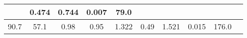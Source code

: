 \documentclass[a4paper,10pt]{article}
\begin{document}
\begin{longtable}{
     |
%    
    c|
%    
    c|
%    
    c|
%    
    c|
%    
    c|
%    
    c|
%    
    c|
%    
    c|
%    
    c|
%    
    c|
%    
    }
%        

%        
        & 0.474
%        

%        

%        
        & 0.744
%        

%        

%        
        & 0.007
%        

%        

%        
        & 79.0
%        

%        
        \\
        \hline

        

%        

%        
        90.7
%        

%        

%        
        & 57.1
%        

%        

%        
        & 0.98
%        

%        

%        
        & 0.95
%        

%        

%        
        & 1.322
%        

%        

%        
        & 0.49
%        

%        

%        
        & 1.521
%        

%        

%        
        & 0.015
%        

%        

%        
        & 176.0
%        

%        
        \\
        \hline

        
    \end{longtable}
%    
\end{document}
